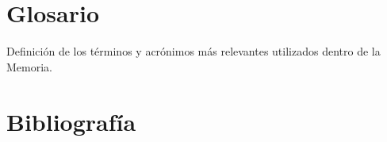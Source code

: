 \documentclass[IB]{TFUOC}%
\begin{document}


\chapter{Glosario}

Definición de los términos y acrónimos más relevantes utilizados dentro de la Memoria.



\chapter{Bibliografía}
\end{document}
